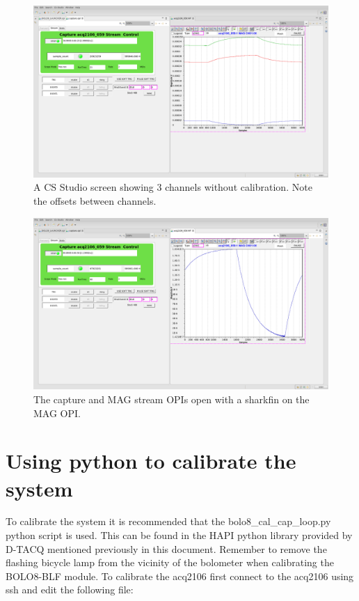 \documentclass{article}
\begin{document}
\begin{figure}
	\centering
	\includegraphics[width=5.0in]{images/3-fin-no-cal.png}
	\caption{A CS Studio screen showing 3 channels without calibration. Note the offsets between channels.}
	\label{bolocss3finnocal}
\end{figure}

\begin{figure}
	\centering
	\includegraphics[width=5.0in]{images/1-fin-no-cal.png}
	\caption{The capture and MAG stream OPIs open with a sharkfin on the MAG OPI.}
	\label{bolocsscapture}
\end{figure}

\newpage

\section{Using python to calibrate the system}
To calibrate the system it is recommended that the bolo8\_cal\_cap\_loop.py python script is used.
This can be found in the HAPI python library provided by D-TACQ mentioned previously in this document.
Remember to remove the flashing bicycle lamp from the vicinity of the bolometer when calibrating the BOLO8-BLF module.
\newline
To calibrate the acq2106 first connect to the acq2106 using ssh and edit the following file:
\end{document}
